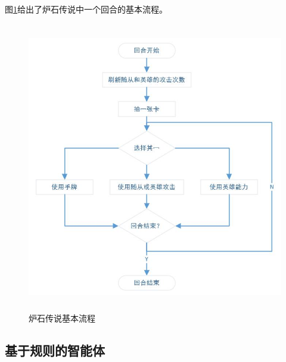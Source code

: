 图\ref{fig:2}给出了炉石传说中一个回合的基本流程。

\begin{figure}[!ht]
\centering
\includegraphics[width=5in,height=5in]{img/Fig2.jpg}
\caption{炉石传说基本流程}
\label{fig:2}
\end{figure}


\subsection{基于规则的智能体}
\label{section:RuleBasedAIPlayers}

